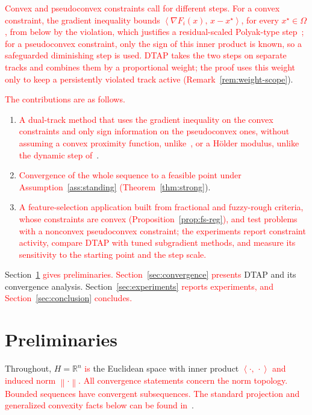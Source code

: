 \documentclass[]{interact}
\theoremstyle{plain}
\theoremstyle{definition}
\theoremstyle{remark}
\newcommand{\R}{\mathbb{R}}
\newcommand{\norm}[1]{\left\lVert #1 \right\rVert}
\newcommand{\inner}[2]{\left\langle #1,\, #2 \right\rangle}
\newcommand{\dtap}{\textsc{DTAP}}
\begin{document}
\leavevmode\textcolor{red}{Convex and pseudoconvex constraints call for different steps. For a convex constraint, the gradient inequality bounds $\inner{\nabla F_i(x)}{x-x^\star}$, for every $x^\star\in\Omega$, from below by the violation, which justifies a residual-scaled Polyak-type step~\citep{polyak1969,lopez2012}; for a pseudoconvex constraint, only the sign of this inner product is known, so a safeguarded diminishing step is used. DTAP takes the two steps on separate tracks and combines them by a proportional weight; the proof uses this weight only to keep a persistently violated track active (Remark~\ref{rem:weight-scope}}).

\leavevmode\textcolor{red}{The contributions are as follows.}
\begin{enumerate}[label=\textbf{C\arabic*.},leftmargin=2.4em,itemsep=3pt]
\item \leavevmode\textcolor{red}{A dual-track method that uses the gradient inequality on the convex constraints and only sign information on the pseudoconvex ones, without assuming a convex proximity function, unlike~\citep{li2013nsfp}, or a H\"older modulus, unlike the dynamic step of~\citep{hu2022quasi}}.
\item \leavevmode\textcolor{red}{Convergence of the whole sequence to a feasible point under Assumption~\ref{ass:standing} (Theorem~\ref{thm:strong}}).
\item \leavevmode\textcolor{red}{A feature-selection application built from fractional and fuzzy-rough criteria, whose constraints are convex (Proposition~\ref{prop:fs-reg}), and test problems with a nonconvex pseudoconvex constraint; the experiments report constraint activity, compare DTAP with tuned subgradient methods, and measure its sensitivity to the starting point and the step scale.}
\end{enumerate}

Section~\leavevmode\textcolor{red}{\ref{sec:prelim} gives preliminaries. Section~\ref{sec:convergence} presents} \dtap{} and its convergence analysis. Section~\leavevmode\textcolor{red}{\ref{sec:experiments} reports experiments, and Section~\ref{sec:conclusion} concludes.}


\section{Preliminaries}\label{sec:prelim}
Throughout, $H=\R^n$ \leavevmode\textcolor{red}{is} the Euclidean space with inner product \leavevmode\textcolor{red}{$\inner{\cdot}{\cdot}$ and induced norm $\norm{\cdot}$. All convergence statements concern the norm topology. Bounded sequences have convergent subsequences. The standard projection and generalized convexity facts below can be found in~\citep{bauschke2011,mangasarian1994}}.
\end{document}
